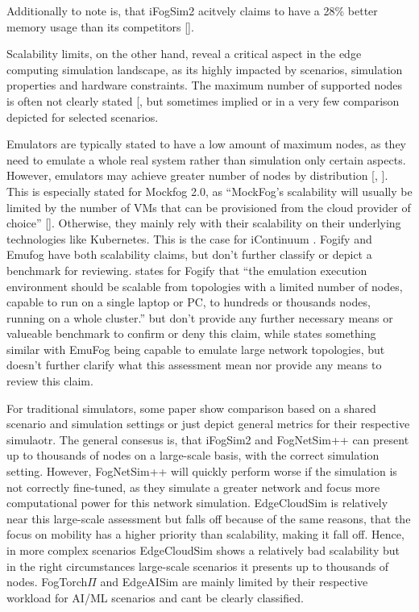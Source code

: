 Additionally to note is, that iFogSim2 acitvely claims to have a 28\% better memory usage than its competitors [\cite{sim-ifogsim2}].

Scalability limits, on the other hand, reveal a critical aspect in the edge computing simulation landscape, as its highly impacted by scenarios, simulation properties and hardware constraints.
The maximum number of supported nodes is often not clearly stated [\cite{qi2025surveyopensourceedgecomputing}, but sometimes implied or in a very few comparison depicted for selected scenarios.

Emulators are typically stated to have a low amount of maximum nodes, as they need to emulate a whole real system rather than simulation only certain aspects.
However, emulators may achieve greater number of nodes by distribution [\cite{qi2025surveyopensourceedgecomputing}, \cite{sim-mockfog2}].
This is especially stated for Mockfog 2.0, as ``MockFog’s scalability will usually be limited by the number of VMs that can be provisioned from the cloud provider of choice'' [\cite{sim-mockfog2}].
Otherwise, they mainly rely with their scalability on their underlying technologies like Kubernetes. This is the case for iContinuum \cite{sim-icontinuum}.
Fogify and Emufog have both scalability claims, but don't further classify or depict a benchmark for reviewing.
\cite{sim-fogify} states for Fogify that ``the emulation execution environment should be scalable from topologies with a limited number of nodes, capable to run on a single laptop or PC, to hundreds or thousands nodes, running on a whole cluster.'' but don't provide any further necessary
means or valueable benchmark to confirm or deny this claim, while \cite{sim-emufog} states something similar with EmuFog being capable to emulate large network topologies, but doesn't further clarify what this assessment mean nor provide any means to review this claim.

For traditional simulators, some paper show comparison based on a shared scenario and simulation settings or just depict general metrics for their respective simulaotr.
The general consesus is, that iFogSim2 and FogNetSim++ can present up to thousands of nodes on a large-scale basis, with the correct simulation setting.
However, FogNetSim++ will quickly perform worse if the simulation is not correctly fine-tuned, as they simulate a greater network and focus more computational power for this network simulation.
EdgeCloudSim is relatively near this large-scale assessment but falls off because of the same reasons, that the focus on mobility has a higher priority than scalability, making it fall off.
Hence, in more complex scenarios EdgeCloudSim shows a relatively bad scalability but in the right circumstances large-scale scenarios it presents up to thousands of nodes.
FogTorch$\Pi$ and EdgeAISim are mainly limited by their respective workload for AI/ML scenarios and cant be clearly classified.

